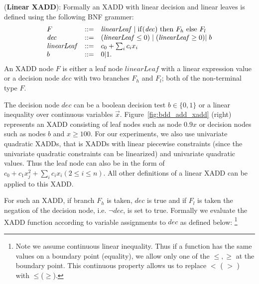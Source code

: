 \documentclass[twoside,11pt]{article}
\newenvironment{mydef}[1][Definition]{\begin{trivlist}
\item[\hskip \labelsep {\bfseries #1}]}{\end{trivlist}}
\begin{document}
\begin{mydef}(\textbf{Linear XADD}):
Formally an XADD with linear decision and linear leaves is defined using the following BNF grammer: 
\begin{equation}
\nonumber
\begin{array}{lll}
F&::=&  \mathit{linearLeaf}  \hspace{1mm} \vert  \hspace{1mm} \mathrm{if} (\mathit{dec})\ \mathrm{then}\ F_h\ \mathrm{else}\ F_l \\
\mathit{dec} &::=& ( \mathit{linearLeaf} \leq 0)  \hspace{1mm}\vert \hspace{1mm}
 ( \mathit{linearLeaf} \geq 0) \vert \hspace{1mm} b\\
\mathit{linearLeaf} &::=&c_0+\sum_{i} c_i x_i\\
b&::=& 0|1.
\end{array}
\end{equation}
An XADD node $F$ is either a leaf node $\mathit{linearLeaf}$ with a linear expression value or a decision node $\mathit{dec}$ with two branches $F_h$ and $F_l$; both of the non-terminal type $F$. 

The decision node $\mathit{dec}$ can be a boolean decision test $b\in \lbrace 0,1 \rbrace$ or a linear inequality over continuous variables $\vec{x}$. Figure~\ref{fig:bdd_add_xadd} (right) represents an XADD consisting of leaf nodes such as node $0.9x$ or decision nodes such as nodes $b$ and $x \geq 100$. For our experiments, we also use univariate quadratic XADDs, that is XADDs with linear piecewise constraints (since the univariate quadratic constraints can be linearized) and univariate quadratic values. Thus the leaf node can also be in the form of $c_0+ c_1 x_j^2 + \sum_{i} c_i x_i (2 \leq i \leq n)$. All other definitions of a linear XADD can be applied to this XADD.
\end{mydef}

For such an XADD, if branch $F_h$ is taken, $\mathit{dec}$ is true and if $F_l$ is taken the negation of the decision node, i.e. $\neg \mathit{dec}$, is set to true. Formally we evaluate the XADD function according to variable assignments to $\mathit{dec}$ as defined below: \footnote {Note we assume continuous linear inequality. Thus if a function has the same values on a boundary point (equality), we allow only one of the $\leq, \geq$ at the boundary point. This continuous property allows us to replace $<$ ( $>$ ) with $\leq$($\geq$).} 
\end{document}
